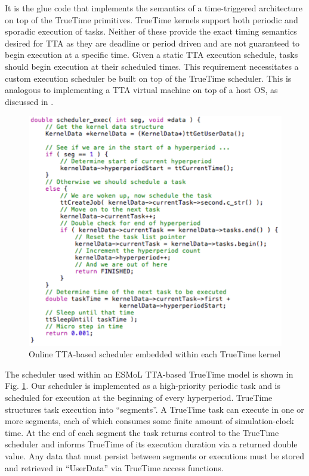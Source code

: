 It is the glue code that implements the semantics of a time-triggered architecture on top of the TrueTime primitives.  TrueTime kernels support both periodic and sporadic execution of tasks.  Neither of these provide the exact timing semantics desired for TTA as they are deadline or period driven and are not guaranteed to begin execution at a specific time.  Given a static TTA execution schedule, tasks should begin execution at their scheduled times.  This requirement necessitates a custom execution scheduler be built on top of the TrueTime scheduler.  This is analogous to implementing a TTA virtual machine on top of a host OS, as discussed in \cite{pvknks_09}.
\begin{figure}[ht]
\centering
\includegraphics[width=\columnwidth]{figures/scheduler.pdf}
    \caption{Online TTA-based scheduler embedded within each TrueTime kernel}
    \label{fig:scheduler}
\end{figure}
The scheduler used within an ESMoL TTA-based TrueTime model is shown in Fig. \ref{fig:scheduler}.  Our scheduler is implemented as a high-priority periodic task and is scheduled for execution at the beginning of every hyperperiod. TrueTime structures task execution into ``segments''.  A TrueTime task can execute in one or more segments, each of which consumes some finite amount of simulation-clock time.  At the end of each segment the task returns control to the TrueTime scheduler and informs TrueTime of its execution duration via a returned double value.  Any data that must persist between segments or executions must be stored and retrieved in ``UserData'' via TrueTime access functions.

